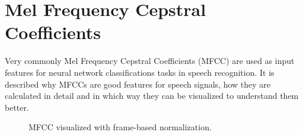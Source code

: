 
\section{Mel Frequency Cepstral Coefficients}\label{sec:signal_mfcc}
\thesisStateNotReady
Very commonly Mel Frequency Cepstral Coefficients (MFCC) are used as input features for neural network classifications tasks in speech recognition.
It is described why MFCCs are good features for speech signals, how they are calculated in detail and in which way they can be visualized to understand them better.

\begin{figure}[!ht]
  \centering
  \caption{MFCC visualized with frame-based normalization.}
  \label{fig:signal_mfcc_showcase}
\end{figure}
\FloatBarrier
\noindent


